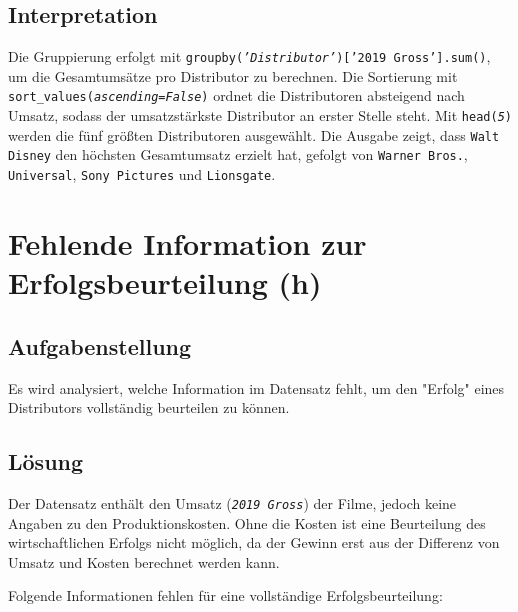\subsection{Interpretation}

Die Gruppierung erfolgt mit \texttt{groupby(\textit{'Distributor'})['2019 Gross'].sum()}, um die Gesamtumsätze pro Distributor zu berechnen. Die Sortierung mit \\ \texttt{sort\_values(\textit{ascending=False})} ordnet die Distributoren absteigend nach Umsatz, sodass der umsatzstärkste Distributor an erster Stelle steht. Mit \texttt{head(\textit{5})} werden die fünf größten Distributoren ausgewählt. Die Ausgabe zeigt, dass \texttt{Walt Disney} den höchsten Gesamtumsatz erzielt hat, gefolgt von \texttt{Warner Bros.}, \texttt{Universal}, \texttt{Sony Pictures} und \texttt{Lionsgate}.

\cleardoublepage


\section{Fehlende Information zur Erfolgsbeurteilung (h)}
\label{sec:1h}

\subsection{Aufgabenstellung}

Es wird analysiert, welche Information im Datensatz fehlt, um den "Erfolg" eines Distributors vollständig beurteilen zu können.

\subsection{Lösung}

Der Datensatz enthält den Umsatz (\textit{\texttt{2019 Gross}}) der Filme, jedoch keine Angaben zu den Produktionskosten. Ohne die Kosten ist eine Beurteilung des wirtschaftlichen Erfolgs nicht möglich, da der Gewinn erst aus der Differenz von Umsatz und Kosten berechnet werden kann.

Folgende Informationen fehlen für eine vollständige Erfolgsbeurteilung:

